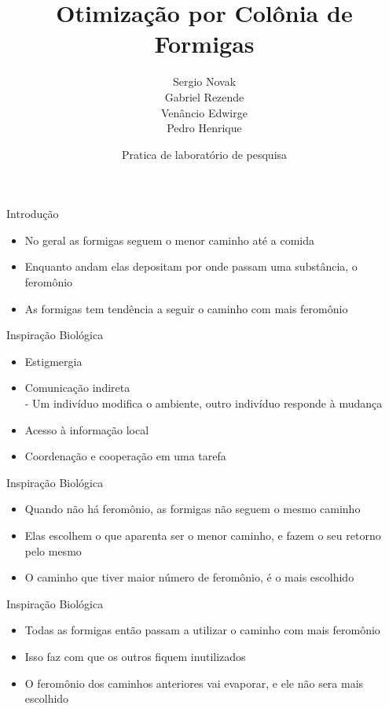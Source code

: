\documentclass[compress]{beamer}
\title{Otimização por Colônia de Formigas}
\author{Sergio Novak \\ Gabriel Rezende \\ Venâncio Edwirge\\ Pedro Henrique}
\date{Pratica de laboratório de pesquisa}
\begin{document}
\frame{\titlepage}


\begin{frame}{Introdução}
\begin{itemize}
\item{No geral as formigas seguem o menor caminho até a comida}
\newline
\item{Enquanto andam elas depositam por onde passam uma substância, o feromônio}
\newline
\item{As formigas tem tendência a seguir o caminho com mais feromônio}
\end{itemize}
\end{frame}

\begin{frame}{Inspiração Biológica}
\begin{itemize}
\item{Estigmergia}
\newline
\item{Comunicação indireta\\ - Um indivíduo modifica o ambiente, outro indivíduo responde à mudança}
\newline
\item{Acesso à informação local}
\newline
\item{Coordenação e cooperação em uma tarefa}
\end{itemize}
\end{frame}

\begin{frame}{Inspiração Biológica}
\begin{itemize}
\item{Quando não há feromônio, as formigas não seguem o mesmo caminho}
\newline
\item{Elas escolhem o que aparenta ser o menor caminho, e fazem o seu retorno pelo mesmo}
\newline
\item{O caminho que tiver maior número de feromônio, é o mais escolhido}
\end{itemize}
\end{frame}

\begin{frame}{Inspiração Biológica}
\begin{itemize}
\newline
\item{Todas as formigas então passam a utilizar o caminho com mais feromônio}
\newline
\item{Isso faz com que os outros fiquem inutilizados}
\newline
\item{O feromônio dos caminhos anteriores vai evaporar, e ele não sera mais escolhido}
\end{itemize}
\end{frame}
\end{document}
